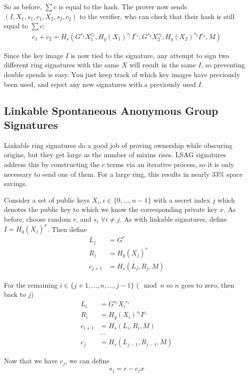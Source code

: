 \documentclass{article}
\begin{document}
So as before, $\sum c$ is equal to the hash.  The prover now sends $(I, X_1, s_1, c_1, X_2, s_2, c_2)$ to the verifier, who can check that their hash is still equal to $\sum c$:
\begin{align}
  c_1 + c_2 = H_s(G^{s_1} X_1^{c_1}, H_g(X_1)^{s_1} I^{c_1}, G^{s_2} X_2^{c_2}, H_g(X_2)^{s_2} I^{c_2}, M)
\end{align}

Since the key image $I$ is now tied to the signature, any attempt to sign two different ring signatures with the same $X$ will result in the same $I$, so preventing double spends is easy.  You just keep track of which key images have previously been used, and reject any new signatures with a previously used $I$.


\subsection{Linkable Spontaneous Anonymous Group Signatures}

Linkable ring signatures do a good job of proving ownership while obscuring origins, but they get large as the number of mixins rises. LSAG signatures address this by constructing the $c$ terms via an iterative process, so it is only necessary to send one of them.  For a large ring, this results in nearly 33\% space savings.

Consider a set of public keys $X_i, i \in \{0, …, n-1\}$ with a secret index $j$ which denotes the public key to which we know the corresponding private key $x$.  As before, choose random $r$, and $s_i$ $\forall i \ne j$.  As with linkable signatures, define $I = H_g(X_j)^x$. Then define
\begin{align}
      L_j &= G^r\\
      R_j &= H_g(X_j)^r\\
  c_{j+1} &= H_s(L_j,R_j, M)
\end{align}

For the remaining $i \in \{j+1, …, n, …, j-1\}$ ($\mod{n}$ so $n$ goes to zero, then back to $j$)
\begin{align}
  L_i &= G^{s_i} {X_i}^{c_i}\\
  R_i &= H_g(X_i)^{s_i} I^{c_i}\\
  c_{i+1} &= H_s(L_i,R_i, M)\\
  &... \nonumber\\
  c_j &= H_s(L_{j-1}, R_{j-1}, M)
\end{align}

Now that we have $c_j$, we can define
\begin{align}
  s_j = r - c_j x\nonumber
\end{align}
\end{document}
